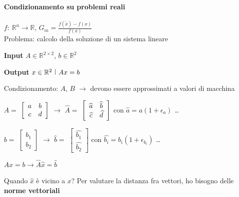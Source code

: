 \documentclass[10pt]{book}
\begin{document}
\paragraph{Condizionamento su problemi reali} $f:\:\mathbb{R}^n \rightarrow \mathbb{R}$, $G_m = \frac{f(\tilde{x}) - f(x)}{f(x)}$\\
Problema: calcolo della soluzione di un sistema lineare
\begin{list}{}{}
	\item \textbf{Input} $A \in \mathbb{R}^{2 \times 2}$, $b \in \mathbb{R}^2$
	\item \textbf{Output} $x \in \mathbb{R}^2\:\:\vline\:\:Ax = b$
\end{list}
Condizionamento: $A$, $B$ $\rightarrow$ devono essere approssimati a valori di macchina
\begin{list}{}{}
	\item $A = $
	\begin{math}
		\left[
		\begin{array}{c c}
			a & b\\
			c & d
		\end{array}
		\right]
	\end{math}
	$\rightarrow$ $\widehat{A} = $
	\begin{math}
		\left[
		\begin{array}{c c}
			\widehat{a} & \widehat{b}\\
			\widehat{c} & \widehat{d}
		\end{array}
		\right]
	\end{math}
	con $\widehat{a} = a(1 + \epsilon_a)$ \ldots
	\item $b = $
	\begin{math}
		\left[
		\begin{array}{c}
			b_1\\
			b_2
		\end{array}
		\right]
	\end{math}
	$\rightarrow$ $\widehat{b} = $
	\begin{math}
		\left[
		\begin{array}{c}
			\widehat{b_1}\\
			\widehat{b_2}
		\end{array}
		\right]
	\end{math}
	con $\widehat{b_i} = b_i(1 + \epsilon_{b_i})$ \ldots
	\item $Ax = b \rightarrow \widehat{A}\widehat{x} = \widehat{b}$
\end{list}
Quando $\widehat{x}$ è vicino a $x$? Per valutare la distanza fra vettori, ho bisogno delle \textbf{norme vettoriali}
\end{document}
